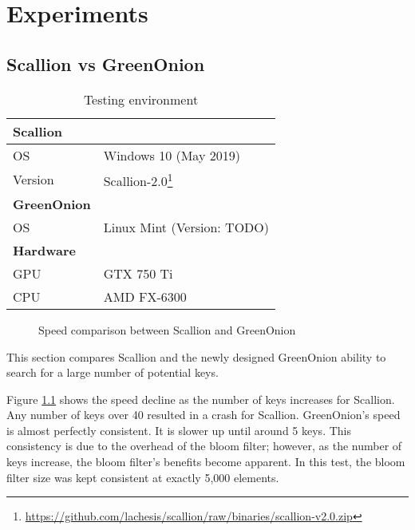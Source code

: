 \chapter{Experiments}
\label{cha:Experiments}

\section{Scallion vs GreenOnion}
\label{sec:SvG}


\begin{wraptable}[11]{r}{6cm}
    \centering
    \begin{tabular}{|ll|}
        \hline
        \textbf{Scallion} & \\
        \hline
        OS & Windows 10 (May 2019) \\
        Version & Scallion-2.0\footnote{\url{https://github.com/lachesis/scallion/raw/binaries/scallion-v2.0.zip}} \\
        \hline
        \textbf{GreenOnion} & \\
        \hline
        OS & Linux Mint (Version: TODO) \\ 
        \hline
        \textbf{Hardware} & \\
        \hline
        GPU & GTX 750 Ti  \\
        CPU & AMD FX-6300 \\
        \hline
    \end{tabular}
    \caption{Testing environment}
\end{wraptable}

\begin{figure}[h!]
    \centering
    
    \label{tab:scallion_speed}
    \caption{Speed comparison between Scallion and GreenOnion}
\end{figure}

This section compares Scallion and the newly designed GreenOnion ability to search for a large number of potential keys.

Figure \ref{tab:scallion_speed} shows the speed decline as the number of keys increases for Scallion. Any number of keys over 40 resulted in a crash for Scallion. GreenOnion's speed is almost perfectly consistent. It is slower up until  around 5 keys. This consistency is due to the overhead of the bloom filter; however, as the number of keys increase, the bloom filter's benefits become apparent. In this test, the bloom filter size was kept consistent at exactly 5,000 elements.

